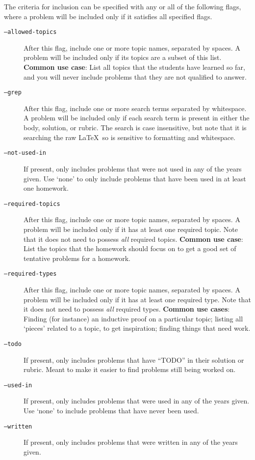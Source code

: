    The criteria for inclusion can be specified with any or all of the following flags, where a problem will be included only if it satisfies all specified flags.
    \begin{description}
      \item[\texttt{--allowed-topics}] After this flag, include one or more topic names, separated by spaces. A problem will be included only if its topics are a subset of this list. \textbf{Common use case}: List all topics that the students have learned so far, and you will never include problems that they are not qualified to answer.
      \item[\texttt{--grep}] After this flag, include one or more search terms separated by whitespace. A problem will be included only if each search term is present in either the body, solution, or rubric. The search is case insensitive, but note that it is searching the raw \LaTeX\ so is sensitive to formatting and whitespace.
      \item[\texttt{--not-used-in}] If present, only includes problems that were not used in any of the years given. Use `none' to only include problems that have been used in at least one homework.
      \item[\texttt{--required-topics}] After this flag, include one or more topic names, separated by spaces. A problem will be included only if it has at least one required topic. Note that it does not need to possess \textit{all} required topics. \textbf{Common use case}: List the topics that the homework should focus on to get a good set of tentative problems for a homework.
      \item[\texttt{--required-types}] After this flag, include one or more topic names, separated by spaces. A problem will be included only if it has at least one required type. Note that it does not need to possess \textit{all} required types. \textbf{Common use cases}: Finding (for instance) an inductive proof on a particular topic; listing all `pieces' related to a topic, to get inspiration; finding things that need work.
      \item[\texttt{--todo}] If present, only includes problems that have ``TODO'' in their solution or rubric. Meant to make it easier to find problems still being worked on.
      \item[\texttt{--used-in}] If present, only includes problems that were used in any of the years given. Use `none' to include problems that have never been used. 
      \item[\texttt{--written}] If present, only includes problems that were written in any of the years given.
    \end{description}